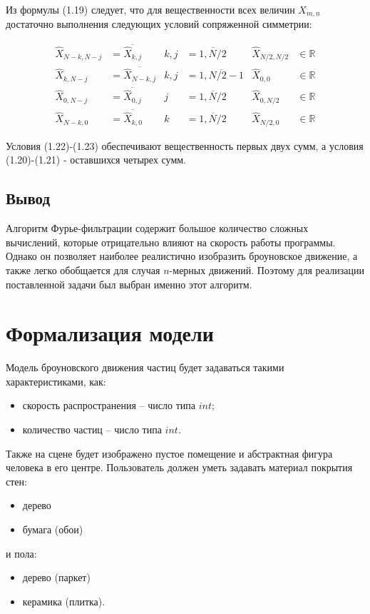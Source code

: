 Из формулы (1.19) следует, что для вещественности всех величин $X_{m,n}$ достаточно выполнения следующих условий сопряженной симметрии:

\begin{align}
	\hat{X}_{N-k,N-j} &= \overline{\hat{X}_{k,j}} &k,j &= \overline{1,N/2} &\hat{X}_{N/2,N/2} & \in \mathbb{R}\\
	\hat{X}_{k,N-j} &= \overline{\hat{X}_{N-k,j}} &k,j &= \overline{1,N/2-1} &\hat{X}_{0,0} & \in \mathbb{R}\\
	\hat{X}_{0,N-j} &= \overline{\hat{X}_{0,j}} &j &= \overline{1,N/2} &\hat{X}_{0,N/2} & \in \mathbb{R}\\
	\hat{X}_{N-k,0} &= \overline{\hat{X}_{k,0}} &k &= \overline{1,N/2} &\hat{X}_{N/2,0} & \in \mathbb{R}
\end{align}

Условия (1.22)-(1.23) обеспечивают вещественность первых двух сумм, а условия (1.20)-(1.21) - оставшихся четырех сумм.

\subsection*{Вывод}

Алгоритм Фурье-фильтрации содержит большое количество сложных вычислений, которые отрицательно влияют на скорость работы программы. Однако он позволяет наиболее реалистично изобразить броуновское движение, а также легко обобщается для случая $n$-мерных движений. Поэтому для реализации поставленной задачи был выбран именно этот алгоритм.

\section{Формализация модели}
Модель броуновского движения частиц будет задаваться такими характеристиками, как:
\begin{itemize} 
	\item скорость распространения -- число типа $int$;
	\item количество частиц -- число типа $int$.
\end{itemize}

Также на сцене будет изображено пустое помещение и абстрактная фигура человека в его центре. Пользователь должен уметь задавать материал покрытия стен:
\begin{itemize} 
	\item дерево
	\item бумага (обои)
\end{itemize}
и пола:
\begin{itemize} 
	\item дерево (паркет)
	\item керамика (плитка).
\end{itemize}


